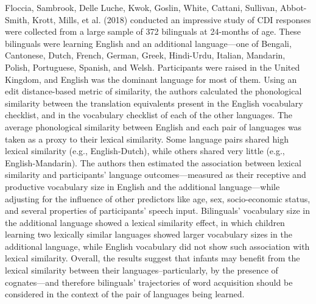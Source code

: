 \documentclass[
  12pt,
  b5paperpaper,
  twoside]{scrreprt}
\begin{document}
Floccia, Sambrook, Delle Luche, Kwok, Goslin, White, Cattani, Sullivan,
Abbot-Smith, Krott, Mills, et al. (2018) conducted an impressive study
of CDI responses were collected from a large sample of 372 bilinguals at
24-months of age. These bilinguals were learning English and an
additional language---one of Bengali, Cantonese, Dutch, French, German,
Greek, Hindi-Urdu, Italian, Mandarin, Polish, Portuguese, Spanish, and
Welsh. Participants were raised in the United Kingdom, and English was
the dominant language for most of them. Using an edit distance-based
metric of similarity, the authors calculated the phonological similarity
between the translation equivalents present in the English vocabulary
checklist, and in the vocabulary checklist of each of the other
languages. The average phonological similarity between English and each
pair of languages was taken as a proxy to their lexical similarity. Some
language pairs shared high lexical similarity (e.g., English-Dutch),
while others shared very little (e.g., English-Mandarin). The authors
then estimated the association between lexical similarity and
participants' language outcomes---measured as their receptive and
productive vocabulary size in English and the additional
language---while adjusting for the influence of other predictors like
age, sex, socio-economic status, and several properties of participants'
speech input. Bilinguals' vocabulary size in the additional language
showed a lexical similarity effect, in which children learning two
lexically similar languages showed larger vocabulary sizes in the
additional language, while English vocabulary did not show such
association with lexical similarity. Overall, the results suggest that
infants may benefit from the lexical similarity between their
languages--particularly, by the presence of cognates---and therefore
bilinguals' trajectories of word acquisition should be considered in the
context of the pair of languages being learned.
\end{document}
